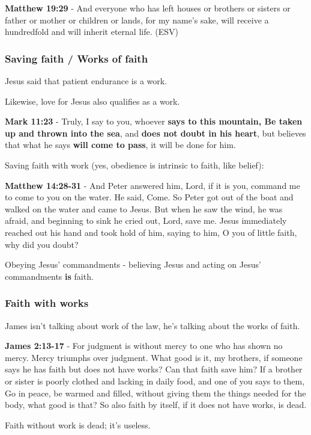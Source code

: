 \documentclass[11pt]{article}
\begin{document}
\textbf{Matthew 19:29} - And everyone who has left houses or brothers or sisters or father or mother or children or lands, for my name's sake, will receive a hundredfold and will inherit eternal life. (ESV)

\subsubsection{Saving faith / Works of faith}
\label{sec:orgf934eac}
Jesus said that patient endurance is a work.

Likewise, love for Jesus also qualifies as a work.

\textbf{Mark 11:23} - Truly, I say to you, whoever \textbf{says to this mountain, Be taken up and thrown into the sea}, and \textbf{does not doubt in his heart}, but believes that what he says \textbf{will come to pass}, it will be done for him.

Saving faith with work (yes, obedience is intrinsic to faith, like belief):

\textbf{Matthew 14:28-31} - And Peter answered him, Lord, if it is you, command me to come to you on the water. He said, Come. So Peter got out of the boat and walked on the water and came to Jesus. But when he saw the wind, he was afraid, and beginning to sink he cried out, Lord, save me. Jesus immediately reached out his hand and took hold of him, saying to him, O you of little faith, why did you doubt?

Obeying Jesus' commandments - believing Jesus and acting on Jesus' commandments \textbf{is} faith.

\subsubsection{Faith with works}
\label{sec:org5057b12}
James isn't talking about work of the law, he's talking about the works of faith.

\textbf{James 2:13-17} - For judgment is without mercy to one who has shown no mercy. Mercy triumphs over judgment. What good is it, my brothers, if someone says he has faith but does not have works? Can that faith save him? If a brother or sister is poorly clothed and lacking in daily food, and one of you says to them, Go in peace, be warmed and filled, without giving them the things needed for the body, what good is that? So also faith by itself, if it does not have works, is dead.

Faith without work is dead; it's useless.
\end{document}
